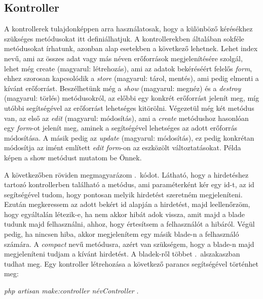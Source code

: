 \documentclass[]{thesis-ekf}
\theoremstyle{definition}
\theoremstyle{remark}
\begin{document}
	\subsection{Kontroller}\label{sc-kontroller}
		A kontrollerek tulajdonképpen arra használatosak, hogy a különböző kérésékhez szükséges metódusokat itt definiálhatjuk. A kontrollerekben általában sokféle metódusokat írhatunk, azonban alap esetekben a következő lehetnek. Lehet index nevű, ami az összes adat vagy más néven erőforrások megjelenítésére szolgál, lehet még create (magyarul: létrehozás), ami az adatok bekéréséért felelős \emph{form}, ehhez szorosan kapcsolódik a \emph{store} (magyarul: tárol, mentés), ami pedig elmenti a kívánt erőforrást. Beszélhetünk még a \emph{show} (magyarul: megnéz) és a \emph{destroy} (magyarul: törlés) metódusokról, az előbbi egy konkrét erőforrást jelenít meg, míg utóbbi segítségével az erőforrást lehetséges kitörölni. Végezetül még két metódus van, az első az \emph{edit} (magyarul: módosítás), ami a \emph{create} metódushoz hasonlóan egy \emph{form}-ot jelenít meg, aminek a segítségével lehetséges az adott erőforrás módosítása. A másik pedig az \emph{update} (magyarul: módosítás), ez pedig konkrétan módosítja az imént említett \emph{edit form}-on az eszközölt változtatásokat. Példa képen a show metódust mutatom be Önnek. \cite{Laravel}
	
		
	
			A következőben röviden megmagyarázom .~kódot. Látható, hogy a hirdetéshez tartozó kontrollerben található a metódus, ami paraméterként kér egy id-t, az id segítségével tudom, hogy pontosan melyik hirdetést szeretném megjeleníteni. Ezután megkeressem az adott bekért id alapján a hirdetést, majd leellenőrzöm, hogy egyáltalán létezik-e, ha nem akkor hibát adok vissza, amit majd a blade tudunk majd felhasználni, ahhoz, hogy értesítsem a felhasználót a hibáról. Végül pedig, ha nincsen hiba, akkor megjelenítem egy másik blade-n a felhasználó számára. A \emph{compact} nevű metódusra, azért van szükségem, hogy a blade-n majd megjeleníteni tudjam a kívánt hirdetést. A bladek-ről többet .~alszakaszban tudhat meg.  Egy kontroller létrehozása a következő parancs segítségével történhet meg:
		\begin{center} 
			\emph{php artisan make:controller névController} .
		\end{center}
		  
\end{document}
